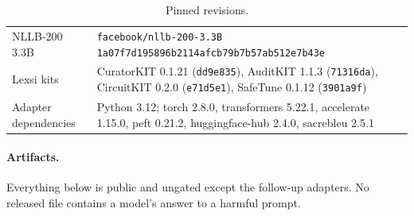 \documentclass[11pt]{article}
\begin{document}
\begin{table}[t]
\begin{tabular}{L{3.8cm}L{11.2cm}}
NLLB-200 3.3B & \texttt{facebook/nllb-200-3.3B} \newline \texttt{1a07f7d195896b2114afcb79b7b57ab512e7b43e} \\
Lexsi kits & CuratorKIT 0.1.21 (\texttt{dd9e835}), AuditKIT 1.1.3 (\texttt{71316da}), CircuitKIT 0.2.0
(\texttt{e71d5e1}), SafeTune 0.1.12 (\texttt{3901a9f}) \\
Adapter dependencies & Python 3.12; torch 2.8.0, transformers 5.22.1, accelerate 1.15.0, peft 0.21.2, huggingface-hub
2.4.0, sacrebleu 2.5.1 \\
\bottomrule
\end{tabular}
\caption{Pinned revisions.}
\label{tab:pins}
\end{table}

\paragraph{Artifacts.} Everything below is public and ungated except the follow-up adapters. No released file
contains a model's answer to a harmful prompt.
\end{document}
